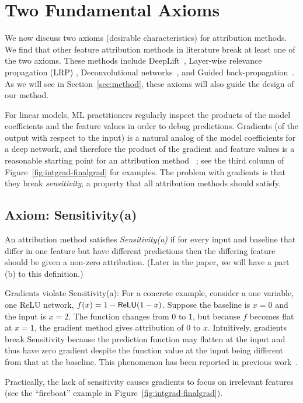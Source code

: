 \section{Two Fundamental Axioms}
\label{sec:two-axioms}

We now discuss two axioms (desirable characteristics) for attribution
methods. We find that other feature attribution methods in literature
break at least one of the two axioms.  These methods include DeepLift~\cite{SGSK16, SGK17},
Layer-wise relevance propagation (LRP)
\cite{BMBMS16}, Deconvolutional networks~\cite{ZF14}, and Guided
back-propagation~\cite{SDBR14}. As we will see in
Section~\ref{sec:method}, these axioms will also guide the design of
our method.

For linear models, ML practitioners regularly inspect the products of the
model coefficients and the feature values in order to debug predictions.
Gradients (of the output with respect
to the input) is a natural analog of the model coefficients for a deep network,
and therefore the product of the gradient and feature values  is a reasonable
starting point for an attribution method ~\cite{BSHKHM10, SVZ13}; see the third column of
Figure~\ref{fig:intgrad-finalgrad} for examples. The problem with
gradients is that they break \emph{sensitivity}, a property
that all attribution methods should satisfy.

\subsection{Axiom: Sensitivity(a)} An attribution method satisfies \emph{Sensitivity(a)}
if for every input and baseline that differ in one feature but have different
predictions then the differing feature should be given a non-zero attribution.
(Later in the paper, we will have a part (b) to this definition.)

Gradients violate Sensitivity(a): For a concrete example, consider a
one variable, one ReLU network, $f(x) = 1 - \mathsf{ReLU}(1-x)$.  Suppose the
baseline is $x=0$ and the input is $x=2$. The function changes from $0$ to
$1$, but because $f$ becomes flat at $x=1$, the gradient method gives
attribution of $0$ to $x$.  Intuitively, gradients break Sensitivity
because the prediction function may flatten at the input and thus have
zero gradient despite the function value at the input being different
from that at the baseline. This phenomenon has been reported in
previous work~\cite{SGSK16}.

Practically, the lack of sensitivity causes gradients to focus on
irrelevant features (see the ``fireboat'' example in
Figure~\ref{fig:intgrad-finalgrad}).

